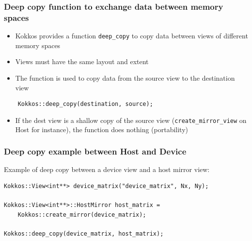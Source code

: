 \documentclass[aspectratio=169]{beamer}
\begin{document}

\begin{frame}[fragile]
    \frametitle{Deep copy function to exchange data between memory spaces}

\begin{itemize}
    \item Kokkos provides a function \texttt{deep\_copy} to copy data between views of different memory spaces
    \item Views must have the same layout and extent
    \item The function is used to copy data from the source view to the destination view
\end{itemize}

\begin{verbatim}
    Kokkos::deep_copy(destination, source);
\end{verbatim}

\begin{itemize}
    \item If the dest view is a shallow copy of the source view (\texttt{create\_mirror\_view} on Host for instance), the function does nothing (portability)
\end{itemize}
\end{frame}


\begin{frame}[fragile]
    \frametitle{Deep copy example between Host and Device}

Example of deep copy between a device view and a host mirror view:

\begin{verbatim}
Kokkos::View<int**> device_matrix("device_matrix", Nx, Ny);

Kokkos::View<int**>::HostMirror host_matrix = 
    Kokkos::create_mirror(device_matrix);

Kokkos::deep_copy(device_matrix, host_matrix);
\end{verbatim}
\end{frame}

\end{document}
